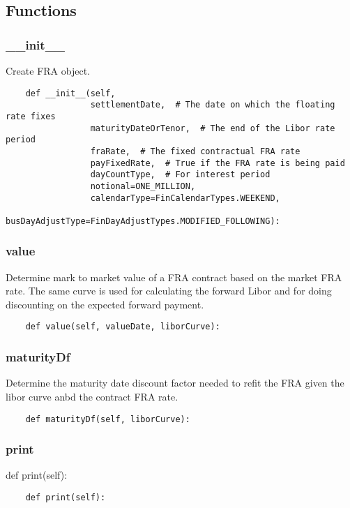\documentclass[twoside,11pt]{book}
\begin{document}
\subsection*{Functions}

\subsubsection*{{\bf \_\_init\_\_}}
Create FRA object.  

\begin{lstlisting}
    def __init__(self,
                 settlementDate,  # The date on which the floating rate fixes
                 maturityDateOrTenor,  # The end of the Libor rate period
                 fraRate,  # The fixed contractual FRA rate
                 payFixedRate,  # True if the FRA rate is being paid
                 dayCountType,  # For interest period
                 notional=ONE_MILLION,
                 calendarType=FinCalendarTypes.WEEKEND,
                 busDayAdjustType=FinDayAdjustTypes.MODIFIED_FOLLOWING):
\end{lstlisting}

\subsubsection*{{\bf value}}
Determine mark to market value of a FRA contract based on the market FRA rate. The same curve is used for calculating the forward Libor and for doing discounting on the expected forward payment.  

\begin{lstlisting}
    def value(self, valueDate, liborCurve):
\end{lstlisting}

\subsubsection*{{\bf maturityDf}}
Determine the maturity date discount factor needed to refit the FRA given the libor curve anbd the contract FRA rate.  

\begin{lstlisting}
    def maturityDf(self, liborCurve):
\end{lstlisting}

\subsubsection*{{\bf print}}
def print(self): 

\begin{lstlisting}
    def print(self):
\end{lstlisting}
\end{document}

